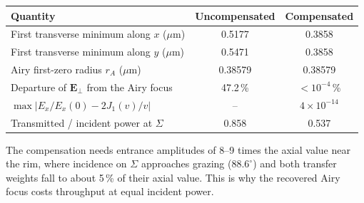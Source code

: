 \documentclass[11pt,a4paper]{article}
\newcommand{\ve}[1]{\bm{#1}}
\begin{document}
\begin{center}
\begin{tabular}{lcc}
\toprule
Quantity & Uncompensated & Compensated \\
\midrule
First transverse minimum along $x$ ($\mu$m) & 0.5177 & 0.3858 \\
First transverse minimum along $y$ ($\mu$m) & 0.5471 & 0.3858 \\
Airy first-zero radius $r_A$ ($\mu$m) & 0.38579 & 0.38579 \\
Departure of $\ve E_\perp$ from the Airy focus & 47.2\,\% & $<10^{-4}$\,\% \\
$\max|E_x/E_x(0)-2J_1(v)/v|$ & -- & $4\times10^{-14}$ \\
Transmitted / incident power at $\Sigma$ & 0.858 & 0.537 \\
\bottomrule
\end{tabular}
\end{center}

The compensation needs entrance amplitudes of 8--9 times the axial value near the
rim, where incidence on $\Sigma$ approaches grazing ($88.6^\circ$) and both
transfer weights fall to about 5\,\% of their axial value. This is why the
recovered Airy focus costs throughput at equal incident power.
\end{document}
